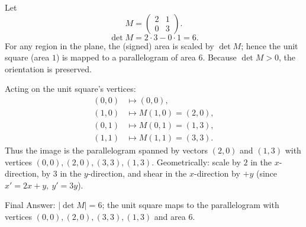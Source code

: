 \documentclass[11pt]{article}
\def\textbf#1{#1}%
\begin{document}
\begin{solution}
Let 
\[
M=\begin{pmatrix}2&1\\[2pt]0&3\end{pmatrix}.
\]
\[
\det M = 2\cdot 3 - 0\cdot 1 = \boxed{6}.
\]
For any region in the plane, the (signed) area is scaled by \(\det M\); hence the unit square
(area \(1\)) is mapped to a parallelogram of area \(\boxed{6}\).  Because \(\det M>0\), the
orientation is preserved.

Acting on the unit square’s vertices:
\[
\begin{aligned}
(0,0) &\mapsto (0,0),\\
(1,0) &\mapsto M(1,0)=(2,0),\\
(0,1) &\mapsto M(0,1)=(1,3),\\
(1,1) &\mapsto M(1,1)=(3,3).
\end{aligned}
\]
Thus the image is the parallelogram spanned by vectors \((2,0)\) and \((1,3)\) with vertices
\((0,0),(2,0),(3,3),(1,3)\).  Geometrically: scale by \(2\) in the \(x\)-direction, by \(3\) in the
\(y\)-direction, and shear in the \(x\)-direction by \(+y\) (since \(x' = 2x + y,\ y'=3y\)).

\begin{center}
\end{center}

\textbf{Final Answer:} \(|\det M|=6\); the unit square maps to the parallelogram with vertices
\((0,0),(2,0),(3,3),(1,3)\) and area \(6\).
\end{solution}
\end{document}
